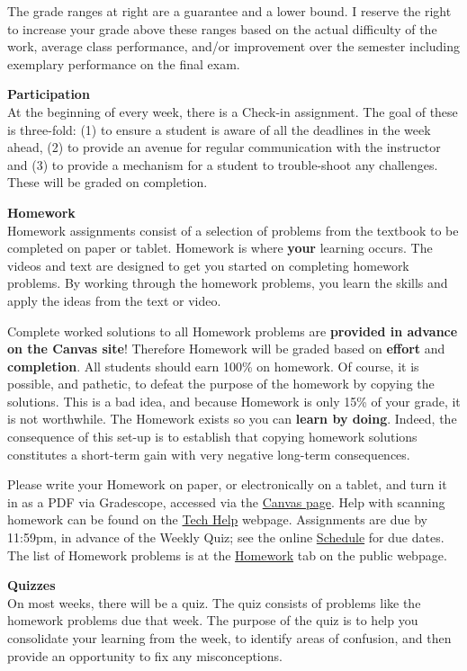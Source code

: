\documentclass[12pt]{article}
\renewcommand{\emph}[1]{\textsf{\textbf{#1}}}
\newcommand{\localhead}[1]{\par\smallskip\textbf{#1} \smallskip\nobreak\\}%
\def\heading#1{\localhead{\large\emph{#1}}}
\begin{document}
The grade ranges at right are a guarantee and a lower bound. I reserve the right to increase your grade above these ranges based on the actual difficulty of the work, average class performance, and/or improvement over the semester including exemplary performance on the final exam. 

\heading{Participation}
At the beginning of every week, there is a Check-in assignment. The goal of these is three-fold: (1) to ensure a student is aware of all the deadlines in the week ahead, (2) to provide an avenue for regular communication with the instructor and (3) to provide a mechanism for a student to trouble-shoot any challenges. These will be graded on completion. 

\newpage
\heading{Homework}
Homework assignments consist of a selection of problems from the textbook to be completed on paper or tablet.  Homework is where \textbf{your} learning occurs. The videos and text are designed to get you started on completing homework problems. By working through the homework problems, you learn the skills and apply the ideas from the text or video.

Complete worked solutions to all Homework problems are \emph{provided in advance on the Canvas site}!  Therefore Homework will be graded based on \emph{effort} and \emph{completion}.  All students should earn 100\% on homework.  Of course, it is possible, and pathetic, to defeat the purpose of the homework by copying the solutions.  This is a bad idea, and because Homework is only 15\% of your grade, it is not worthwhile.  The Homework exists so you can \emph{learn by doing}. Indeed, the consequence of this set-up is to establish that copying homework solutions constitutes a short-term gain with very negative long-term consequences. 

Please write your Homework on paper, or electronically on a tablet, and turn it in as a PDF via Gradescope, accessed via the \href{https://canvas.alaska.edu/courses/21589}{Canvas page}.  Help with scanning homework can be found on the \href{https://uaf-math251.github.io/techHelp.html}{Tech Help} webpage.  Assignments are due by 11:59pm, in advance of the Weekly Quiz; see the online  \href{https://docs.google.com/spreadsheets/d/e/2PACX-1vSetyTdOP14yatuWNH7CuB9yCT3zqOhFWYmCj1BzRAZhU4eHCXCJaRjnCgxgZW_NieE59iLRok3NdzK/pubhtml?gid=0&single=true}{Schedule} for due dates.  The list of Homework problems is at the \href{https://uaf-math251.github.io/calc2/homework.html}{Homework} tab on the public webpage.

\heading{Quizzes}
On most weeks, there will be a quiz.  The quiz consists of problems like the homework problems due that week. The purpose of the quiz is to help you consolidate your learning from the week, to identify areas of confusion, and then provide an opportunity to fix any misconceptions.  
\end{document}
